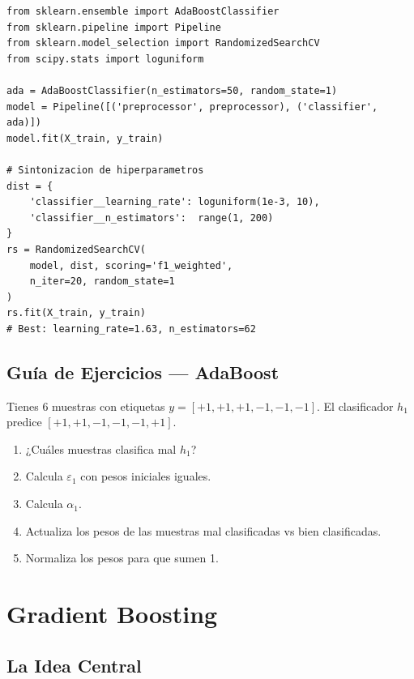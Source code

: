 \documentclass[11pt, a4paper]{book}
\begin{document}
\begin{lstlisting}[caption={AdaBoost con Pipeline completo}]
from sklearn.ensemble import AdaBoostClassifier
from sklearn.pipeline import Pipeline
from sklearn.model_selection import RandomizedSearchCV
from scipy.stats import loguniform

ada = AdaBoostClassifier(n_estimators=50, random_state=1)
model = Pipeline([('preprocessor', preprocessor), ('classifier', ada)])
model.fit(X_train, y_train)

# Sintonizacion de hiperparametros
dist = {
    'classifier__learning_rate': loguniform(1e-3, 10),
    'classifier__n_estimators':  range(1, 200)
}
rs = RandomizedSearchCV(
    model, dist, scoring='f1_weighted',
    n_iter=20, random_state=1
)
rs.fit(X_train, y_train)
# Best: learning_rate=1.63, n_estimators=62
\end{lstlisting}

\section{Guía de Ejercicios — AdaBoost}

\begin{ejercicio}
  Tienes 6 muestras con etiquetas $y = [+1, +1, +1, -1, -1, -1]$.
  El clasificador $h_1$ predice $[+1, +1, -1, -1, -1, +1]$.
  \begin{enumerate}
    \item ¿Cuáles muestras clasifica mal $h_1$?
    \item Calcula $\varepsilon_1$ con pesos iniciales iguales.
    \item Calcula $\alpha_1$.
    \item Actualiza los pesos de las muestras mal clasificadas vs bien clasificadas.
    \item Normaliza los pesos para que sumen 1.
  \end{enumerate}
\end{ejercicio}

\chapter{Gradient Boosting}

\section{La Idea Central}
\end{document}
